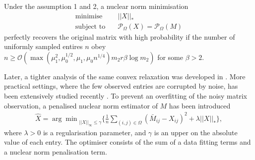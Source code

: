 \documentclass{article} %
\newcommand\mc{\mathcal} %
\begin{document}
\begin{theorem}
Under the assumption 1 and 2, a nuclear norm minimisation
\begin{align}
\text{minimise}&\quad ||X||_* \\
\text{subject to}&\quad \mc{P}_{\Omega}(X) = \mc{P}_{\Omega}(M) 
\end{align}
perfectly recovers the original matrix with high probability if the number of uniformly sampled entires $n$ obey $n\geq \mathcal{O}(\max(\mu_1^2,\mu_0^{1/2},\mu_1,\mu_0n^{1/4}) m_2 r \beta \log m_2)$ for some $\beta > 2$.
\end{theorem}
Later, a tighter analysis of the same convex relaxation was developed in \cite{candes2010power,recht2011simpler}. More practical settings, where the few observed entries are corrupted by noise, has been extensively studied recently \cite{candes2010matrix,keshavan2010matrix,negahban2012restricted,klopp2014noisy,lafond2015low}. 
To prevent an overfitting of the noisy matrix observation, a penalised nuclear norm estimator of $M$ has been introduced
\begin{align}\label{eqn:nn_est}
\hat{X} = {\arg\min}_{||{X}||_\infty \leq \gamma} \bigg\{\frac{1}{n} \sum_{(i,j) \in \Omega}(\bar{M}_{ij} - {X}_{ij})^2 + \lambda ||{X}||_* \bigg\},
\end{align}
where $\lambda > 0$ is a regularisation parameter, and $\gamma$ is an upper on the absolute value of each entry. The optimiser consists of the sum of a data fitting terms and a nuclear norm penalisation term.
\end{document}
